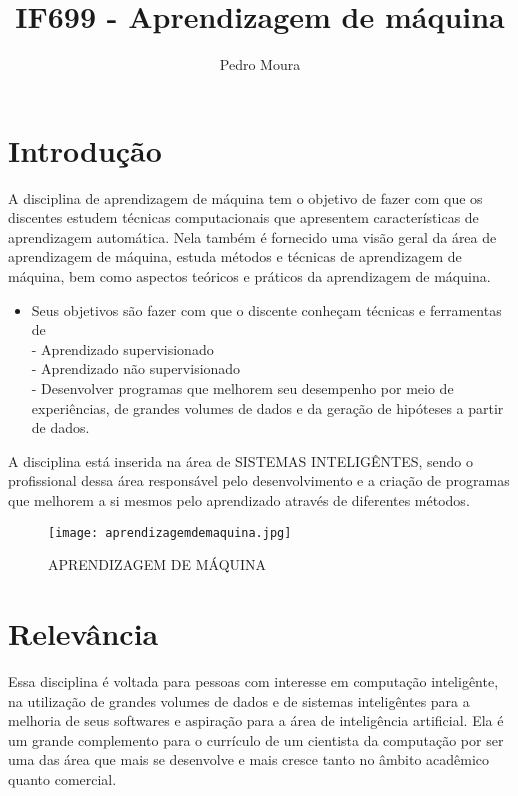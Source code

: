 \documentclass[10pt]{article}
\title{IF699 - Aprendizagem de máquina}
\author{Pedro Moura}
\date{\vspace{-5ex}}
\begin{document}
\maketitle

\section{Introdução}

A disciplina de aprendizagem de máquina tem o objetivo de fazer com que os discentes estudem técnicas computacionais que apresentem características de aprendizagem automática. Nela também é fornecido uma visão geral da área de aprendizagem de máquina, estuda métodos e técnicas de aprendizagem de máquina, bem como aspectos teóricos e práticos da aprendizagem de máquina.

\begin{itemize}
  \item Seus objetivos são fazer com que o discente conheçam técnicas e ferramentas de
\\- Aprendizado supervisionado
\\ - Aprendizado não supervisionado
\\ - Desenvolver programas que melhorem seu desempenho por meio de experiências, de grandes volumes de dados e da geração de hipóteses a partir de dados.
\end{itemize}

A disciplina está inserida na área de SISTEMAS INTELIGÊNTES, sendo o profissional dessa área responsável pelo desenvolvimento e a criação de programas que melhorem a si mesmos pelo aprendizado através de diferentes métodos.

\begin{figure}[]
    \centering
    \texttt{[image: aprendizagemdemaquina.jpg]}
    \caption{APRENDIZAGEM DE MÁQUINA \cite{quarta}}
    \label{fig:realidadevirtual}
\end{figure}

\section{Relevância}
Essa disciplina é voltada para pessoas com interesse em computação inteligênte, na utilização de grandes volumes de dados e de sistemas inteligêntes para a melhoria de seus softwares e aspiração para a área de inteligência artificial. Ela é um grande complemento para o currículo de um cientista da computação por ser uma das área que mais se desenvolve e mais cresce tanto no âmbito acadêmico quanto comercial.\cite{primeira}
\end{document}
